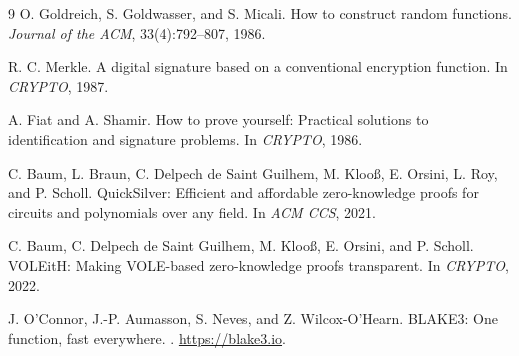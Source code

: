 \documentclass[11pt,a4paper]{article}
\begin{document}
\begin{thebibliography}{9}
O. Goldreich, S. Goldwasser, and S. Micali.
\newblock How to construct random functions.
\newblock \emph{Journal of the ACM}, 33(4):792--807, 1986.

R. C. Merkle.
\newblock A digital signature based on a conventional encryption function.
\newblock In \emph{CRYPTO}, 1987.

A. Fiat and A. Shamir.
\newblock How to prove yourself: Practical solutions to identification and
signature problems.
\newblock In \emph{CRYPTO}, 1986.

C. Baum, L. Braun, C. Delpech de Saint Guilhem, M. Kloo\ss,
E. Orsini, L. Roy, and P. Scholl.
\newblock QuickSilver: Efficient and affordable zero-knowledge proofs for
circuits and polynomials over any field.
\newblock In \emph{ACM CCS}, 2021.

C. Baum, C. Delpech de Saint Guilhem, M. Kloo\ss, E. Orsini, and P. Scholl.
\newblock VOLEitH: Making VOLE-based zero-knowledge proofs transparent.
\newblock In \emph{CRYPTO}, 2022.

J. O'Connor, J.-P. Aumasson, S. Neves, and Z. Wilcox-O'Hearn.
\newblock BLAKE3: One function, fast everywhere.
. \url{https://blake3.io}.

\end{thebibliography}
\end{document}
